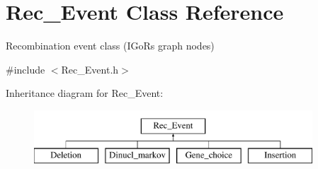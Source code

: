 \hypertarget{classRec__Event}{}\section{Rec\+\_\+\+Event Class Reference}
\label{classRec__Event}


Recombination event class (I\+GoR\textquotesingle{}s graph nodes)  




{\ttfamily \#include $<$Rec\+\_\+\+Event.\+h$>$}

Inheritance diagram for Rec\+\_\+\+Event\+:\begin{figure}[H]
\begin{center}
\leavevmode
\includegraphics[height=2.000000cm]{dc/d20/classRec__Event}
\end{center}
\end{figure}
